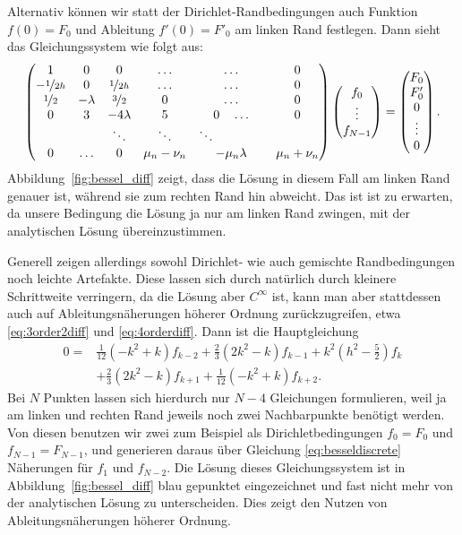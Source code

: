 Alternativ können wir statt der Dirichlet-Randbedingungen auch
Funktion $f(0) = F_0$ und Ableitung $f'(0)=F'_0$ am linken Rand
festlegen. Dann sieht das Gleichungssystem wie folgt aus:
\begin{equation}
  \begin{pmatrix}
    1 & 0         & 0         &\ldots & \ldots & 0\\
    -\nicefrac{1}{2h} & 0         & \nicefrac{1}{2h} &\ldots & \ldots & 0\\
    \nicefrac{1}{2} & -\lambda & \nicefrac{3}{2} & 0 & \ldots & 0\\
    0 & 3         & -4\lambda & 5 & 0\quad \ldots & 0\\
    & & \ddots & \ddots & \ddots\qquad\qquad \\
    0 & \ldots & 0 & \mu_n - \nu_n & -\mu_n\lambda & \mu_n + \nu_n\\
  \end{pmatrix}
  \begin{pmatrix}
    f_0\\
    \vdots\\
    f_{N-1}
  \end{pmatrix}=
  \begin{pmatrix}
    F_0\\
    F'_0\\
    0\\
    \vdots\\
    0 \\
  \end{pmatrix}.
\end{equation}
Abbildung~\ref{fig:bessel_diff} zeigt, dass die Lösung in diesem Fall
am linken Rand genauer ist, während sie zum rechten Rand hin
abweicht. Das ist ist zu erwarten, da unsere Bedingung die Lösung ja
nur am linken Rand zwingen, mit der analytischen Lösung
übereinzustimmen.

Generell zeigen allerdings sowohl Dirichlet- wie auch gemischte
Randbedingungen noch leichte Artefakte. Diese lassen sich durch
natürlich durch kleinere Schrittweite verringern, da die Lösung aber
$C^\infty$ ist, kann man aber stattdessen auch auf
Ableitungsnäherungen höherer Ordnung zurückzugreifen, etwa
\eqref{eq:3order2diff} und \eqref{eq:4orderdiff}. Dann ist die
Hauptgleichung
\begin{align}
  0 = &\frac{1}{12}(-k^2 + k)f_{k-2}
  + \frac{2}{3}(2k^2 - k)f_{k-1}
  + k^2\left(h^2 - \frac{5}{2}\right)f_k\nonumber\\
  &+ \frac{2}{3}(2k^2 - k)f_{k+1}
  + \frac{1}{12}(-k^2 + k)f_{k+2}.
\end{align}
Bei $N$ Punkten lassen sich hierdurch nur $N-4$ Gleichungen
formulieren, weil ja am linken und rechten Rand jeweils noch zwei
Nachbarpunkte benötigt werden. Von diesen benutzen wir zwei zum
Beispiel als Dirichletbedingungen $f_0 = F_0$ und $f_{N-1} = F_{N-1}$,
und generieren daraus über Gleichung \eqref{eq:besseldiscrete}
Näherungen für $f_1$ und $f_{N-2}$. Die Lösung dieses Gleichungssystem
ist in Abbildung~\ref{fig:bessel_diff} blau gepunktet eingezeichnet
und fast nicht mehr von der analytischen Lösung zu unterscheiden. Dies
zeigt den Nutzen von Ableitungsnäherungen höherer Ordnung.

